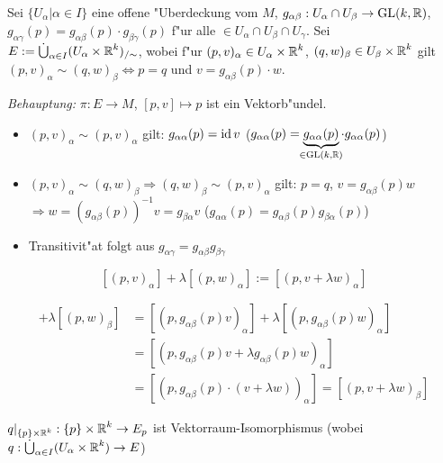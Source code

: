 \begin{Loes}
Sei $\{U_\alpha | \alpha \in I\}$ eine offene "Uberdeckung vom $M$, $g_{\alpha\beta}: U_\alpha \cap U_\beta \to \operatorname{GL}(k,\operatorname{\mathbb{R}})$, $g_{\alpha\gamma}(p) = g_{\alpha\beta}(p) \cdot g_{\beta\gamma}(p)$ f"ur alle $ \in U_\alpha \cap U_\beta \cap U_\gamma$. Sei $E := \dot\bigcup_{\alpha \in I} (U_\alpha \times \operatorname{\mathbb{R}}^k)_{/\sim}$, wobei f"ur $(p,v)_\alpha \in U_\alpha \times \operatorname{\mathbb{R}}^k$, $(q,w)_\beta \in U_\beta \times \operatorname{\mathbb{R}}^k$ gilt $(p,v)_\alpha \sim (q,w)_\beta \Leftrightarrow p=q$ und $v = g_{\alpha\beta}(p) \cdot w$.

\emph{Behauptung:} $\pi: E \to M$, $[p,v] \mapsto p$ ist ein Vektorb"undel.

\begin{description}[leftmargin=*]
\item[\quot{$\bm{\sim}$} ist "Aquivalenzrelation:]\begin{itemize}[leftmargin=*]
	\item
		$(p,v)_\alpha \sim (p,v)_\alpha$ gilt: $g_{\alpha\alpha}(p) = \operatorname{id} v$ ($g_{\alpha\alpha}(p) = \underbrace{g_{\alpha\alpha}(p)}_{\mathclap{\in \GL(k,\R)}} \cdot g_{\alpha\alpha}(p)$)
	\item
		$(p,v)_\alpha \sim (q,w)_\beta \Rightarrow (q,w)_\beta \sim (p,v)_\alpha$ gilt: $p=q$, $v=g_{\alpha\beta}(p)w$ $\Rightarrow w = (g_{\alpha\beta}(p))^{-1} v = g_{\beta\alpha} v$ ($g_{\alpha\alpha}(p) = g_{\alpha\beta}(p) g_{\beta\alpha}(p)$)
	\item
		Transitivit"at folgt aus $g_{\alpha\gamma} = g_{\alpha\beta} g_{\beta\gamma}$
	\end{itemize}
\item[$\bm{E_p}$ ist $\bm{k}$-dimensionaler Vektorraum:]
	\[ [(p,v)_\alpha] + \lambda[(p,w)_\alpha] := [(p, v + \lambda w)_\alpha] \]
	\begin{description}[font=\normalfont\itshape,leftmargin=*]
	\item[unabh"angig von $\alpha$:]
		\begin{align*}
			[(p,v)_\beta] + \lambda[(p,w)_\beta] &= [(p,g_{\alpha\beta}(p)v)_\alpha] + \lambda[(p,g_{\alpha\beta}(p)w)_\alpha] \\
				&= [(p,g_{\alpha\beta}(p)v + \lambda g_{\alpha\beta}(p)w)_\alpha] \\
				&= [(p,g_{\alpha\beta}(p) \cdot(v + \lambda w))_\alpha] = [(p,v + \lambda w)_\beta]
		\end{align*}
	\item[$k$-dimensional:]
		$q|_{\{p\} \times \operatorname{\mathbb{R}}^k} : \{p\} \times \operatorname{\mathbb{R}}^k \to E_p$ ist Vektorraum-Isomorphismus (wobei $q: \dot \bigcup_{\alpha \in I} (U_\alpha \times \operatorname{\mathbb{R}}^k) \to E$)

\end{description}
\end{description}
\end{Loes}
